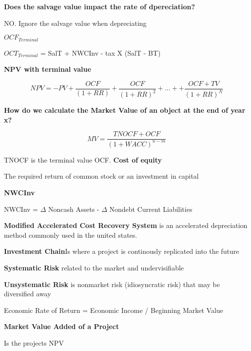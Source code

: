\documentclass[12pt]{article}
\begin{document}
							 			\textbf{Does the salvage value impact the rate of dpereciation? }
							 			
							 			NO. Ignore the salvage value when depreciating
							 			
							 			\textbf{$OCF_{Terminal}$}
							 			
							 			$OCT_{Terminal}$ = SalT + NWCInv - tax X (SalT - BT)
							 			
							 			\textbf{NPV with terminal value}
							 			
							 			$$
							 			NPV = -PV + \dfrac{OCF}{(1 + RR)} + \dfrac{OCF}{(1 + RR)^2} + ... + + \dfrac{OCF + TV}{(1 + RR)^N}
							 			$$
							 			
							 			\textbf{How do we calculate the Market Value of an object at the end of year x?}
							 			
							 			$$
							 			MV = \dfrac{TNOCF + OCF}{(1 + WACC)^{n-m}}
							 			$$
							 			
							 			TNOCF is the terminal value OCF.
							 			\textbf{Cost of equity}
							 			
							 			The required return of common stock or an investment in capital
							 			
							 			\textbf{NWCInv}
							 			
							 			NWCInv = $\Delta$ Noncash Assets - $\Delta$ Nondebt Current Liabilities
							 			
							 			\textbf{Modified Accelerated Cost Recovery System} is an accelerated depreciation method commonly used in the united states. 
							 			
							 			\textbf{Investment Chain}Is where a project is continously replicated into the future
							 			
							 			\textbf{Systematic Risk} related to the market and undervisifiable
							 			
							 			\textbf{Unsystematic Risk} is nonmarket risk (idiosyncratic risk) that may be diversified away
							 			
							 			
							 			Economic Rate of Return = Economic Income / Beginning Market Value
							 			
							 			\textbf{Market Value Added of a Project}
							 			
							 			Is the projects NPV
							 			
\end{document}

